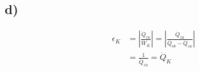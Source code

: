 

\subsection*{d)}

\begin{align*}
\epsilon_K &= \left| \frac{\dot{Q}_{zu}}{\dot{W}_K} \right| = \left| \frac{\dot{Q}_{zu}}{\dot{Q}_{ob} - \dot{Q}_{zu}} \right| \\
&= \frac{1}{\dot{Q}_{zu}} = \dot{Q}_K
\end{align*}